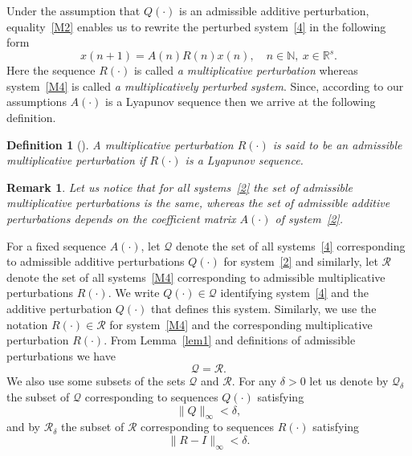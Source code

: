 \documentclass[11pt]{article}
\newtheorem{definition}[theorem]{Definition}
\newtheorem{remark}[theorem]{Remark}
\begin{document}
Under the assumption that $Q(\cdot)$ is an admissible additive perturbation,
equality~\eqref{M2} enables us to rewrite the perturbed system~\eqref{4} in
the following form%
\begin{equation}
x(n+1)=A(n)R(n)x(n),\quad n\in \mathbb{N},\ x\in \mathbb{R}^{s}.  \label{M4}
\end{equation}%
Here the sequence $R(\cdot )$ is called \emph{a multiplicative perturbation%
} whereas system~\eqref{M4} is called  \emph{a multiplicatively perturbed
system}. 
Since,
according to our assumptions $A(\cdot )$ is a Lyapunov sequence then we
arrive
at the following definition.

\begin{definition}[\protect\cite{BP}]
\label{DopMult}A multiplicative perturbation $R(\cdot )$ is said to be
\emph{an admissible multiplicative perturbation} if $R(\cdot )$ is a
Lyapunov sequence.
\end{definition}

\begin{remark}
\label{zam1} Let us notice that for all systems~\eqref{2} the set of
admissible multiplicative perturbations is the same, whereas the set of
admissible additive perturbations depends on the coefficient matrix $%
A(\cdot) $ of  system~\eqref{2}.
\end{remark}

For a fixed sequence $A(\cdot )$, 
let $\mathcal{Q}$ denote
 the set of all
systems~\eqref{4} corresponding to admissible 
additive perturbations $Q(\cdot )$  for system~\eqref{2} and similarly,
let $\mathcal{R}$ denote the set of
all systems~\eqref{M4} corresponding to  admissible multiplicative
perturbations $R(\cdot )$. 
We write $Q(\cdot)\in\mathcal Q$ identifying system~\eqref{4} and the additive perturbation $Q(\cdot)$ that defines this system. 
Similarly, we use the notation $R(\cdot)\in\mathcal R$ for system~\eqref{M4} and the corresponding multiplicative perturbation $R(\cdot)$.
From Lemma~\ref{lem1} and definitions of
admissible perturbations we have%
\begin{equation}
\mathcal{Q}=\mathcal{R}.  \label{Wn1}
\end{equation}
We also use some subsets of the sets $\mathcal{Q}$ and $\mathcal{R}$. 
For any $\delta >0$ let us denote by $\mathcal{Q}_{\delta }$ the subset of 
$\mathcal{Q}$ corresponding to 
sequences $Q(\cdot )$ satisfying 
\begin{equation*}
\| Q\| _{\infty }<\delta, 
\end{equation*}%
and by $\mathcal{R}_{\delta }$ the subset of $\mathcal{R}$ corresponding to
sequences $R(\cdot )$ satisfying%
\begin{equation*}
\| R-I\| _{\infty }<\delta .
\end{equation*}
\end{document}
